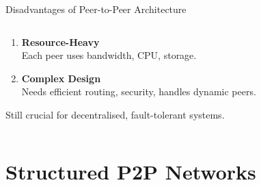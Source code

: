 \documentclass[aspectratio=169, table]{beamer}
\begin{document}
\begin{frame}{Disadvantages of Peer-to-Peer Architecture}
\begin{columns}[t]
\begin{column}{0.5\textwidth}
\begin{enumerate}
				\item \textbf{Resource-Heavy} \\
				Each peer uses bandwidth, CPU, storage.
				
				\item \textbf{Complex Design} \\
				Needs efficient routing, security, handles dynamic peers.
			\end{enumerate}
			
			\vspace{10pt}
			Still crucial for decentralised, fault-tolerant systems.
		\end{column}
		
	\end{columns}
\end{frame}



\section{Structured P2P Networks}
\end{document}
